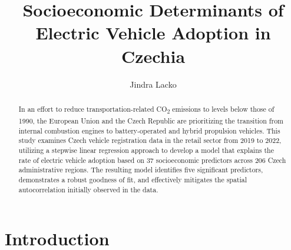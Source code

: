 \documentclass{mmeproc}
\begin{document}
\title{Socioeconomic Determinants of Electric Vehicle Adoption in
Czechia}
\author{
  	Jindra Lacko\null
  }
\begin{abstract} \fontsize{11pt}{13pt}\selectfont
  	In an effort to reduce transportation-related CO\textsubscript{2}
  emissions to levels below those of 1990, the European Union and the
  Czech Republic are prioritizing the transition from internal
  combustion engines to battery-operated and hybrid propulsion vehicles.
  This study examines Czech vehicle registration data in the retail
  sector from 2019 to 2022, utilizing a stepwise linear regression
  approach to develop a model that explains the rate of electric vehicle
  adoption based on 37 socioeconomic predictors across 206 Czech
  administrative regions. The resulting model identifies five
  significant predictors, demonstrates a robust goodness of fit, and
  effectively mitigates the spatial autocorrelation initially observed
  in the data.
\end{abstract}
\maketitle

\hypertarget{introduction}{%
\section{Introduction}\label{introduction}}
\end{document}
